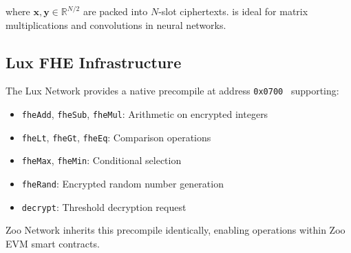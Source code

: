 where $\mathbf{x}, \mathbf{y} \in \mathbb{R}^{N/2}$ are packed into $N$-slot ciphertexts. \CKKS{} is ideal for matrix multiplications and convolutions in neural networks.

\subsection{Lux FHE Infrastructure}

The Lux Network provides a native \FHE{} precompile at address \texttt{0x0700}~\cite{lux-tfhe,lux-fhevm} supporting:

\begin{itemize}
    \item \texttt{fheAdd}, \texttt{fheSub}, \texttt{fheMul}: Arithmetic on encrypted integers
    \item \texttt{fheLt}, \texttt{fheGt}, \texttt{fheEq}: Comparison operations
    \item \texttt{fheMax}, \texttt{fheMin}: Conditional selection
    \item \texttt{fheRand}: Encrypted random number generation
    \item \texttt{decrypt}: Threshold decryption request
\end{itemize}

Zoo Network inherits this precompile identically, enabling \FHE{} operations within Zoo EVM smart contracts.

